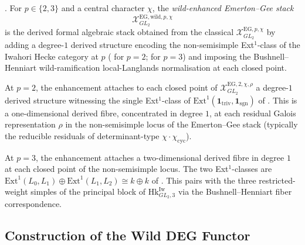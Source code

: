 \begin{definition}
\label{v4-arith:deg-f1a:def:EG-wild-enhanced}
\ClaimStatusDefinitional. For \(p\in\{2,3\}\) and a central character
\(\chi\), the \emph{wild-enhanced Emerton--Gee stack}
\[
\mathcal{X}^{\mathrm{EG,wild},p,\chi}_{GL_{2}}
\]
is the derived formal algebraic stack obtained from the classical
\(\mathcal{X}^{\mathrm{EG},p,\chi}_{GL_{2}}\) by adding a degree-\(1\)
derived structure encoding the non-semisimple Ext\({}^{1}\)-class of
the Iwahori Hecke category at \(p\)
( for \(p=2\);
 for \(p=3\)) and
imposing the Bushnell--Henniart wild-ramification local-Langlands
normalisation at each closed point.
\end{definition}

\begin{remark}[explicit description at \(p=2\)]
\label{v4-arith:deg-f1a:rem:wild-EG-p2}
At \(p=2\), the enhancement attaches to each closed point of
\(\mathcal{X}^{\mathrm{EG},2,\chi,\rho}_{GL_{2}}\) a degree-\(1\)
derived structure witnessing the single Ext\({}^{1}\)-class of
\(\mathrm{Ext}^{1}(\mathbf{1}_{\mathrm{triv}},\mathbf{1}_{\mathrm{sgn}})\)
of . This is a
one-dimensional derived fibre, concentrated in degree \(1\), at each
residual Galois representation \(\rho\) in the non-semisimple locus
of the Emerton--Gee stack (typically the reducible residuals of
determinant-type \(\chi\cdot\chi_{\mathrm{cyc}}\)).
\end{remark}

\begin{remark}[explicit description at \(p=3\)]
\label{v4-arith:deg-f1a:rem:wild-EG-p3}
At \(p=3\), the enhancement attaches a two-dimensional derived fibre
in degree \(1\) at each closed point of the non-semisimple locus.
The two Ext\({}^{1}\)-classes are
\(\mathrm{Ext}^{1}(L_{0},L_{1})\oplus\mathrm{Ext}^{1}(L_{1},L_{2})\cong k\oplus k\)
of . This pairs with
the three restricted-weight simples of the principal block of
\(\mathrm{Hk}^{\mathrm{Iw}}_{GL_{2},3}\) via the Bushnell--Henniart
fiber correspondence.
\end{remark}

\subsection{Construction of the Wild DEG Functor}

